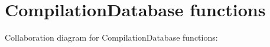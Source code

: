 \hypertarget{group__COMPILATIONDB}{}\section{Compilation\+Database functions}
\label{group__COMPILATIONDB}
Collaboration diagram for Compilation\+Database functions\+:
